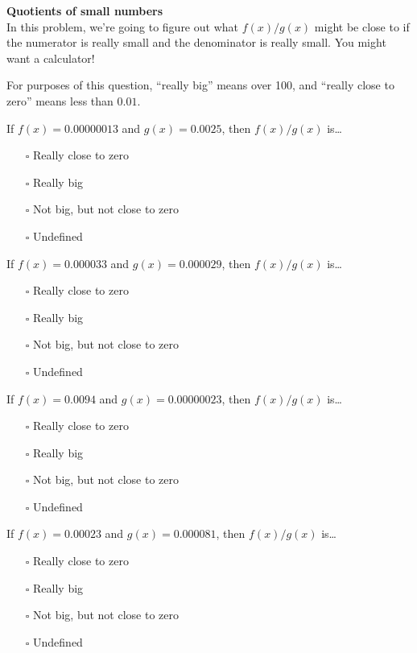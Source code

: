 \documentclass[pdftex, brazil, 12pt, twoside]{article}
\begin{document}
\begin{exercise}
  \textbf{Quotients of small numbers}\\
  In this problem, we're going to figure out what $f(x)/g(x)$ might be close to
  if the numerator is really small and the denominator is really small. You might
  want a calculator!

  For purposes of this question, ``really big'' means over 100,
  and ``really close to zero'' means less than $0.01$.

  If $f(x) = 0.00000013$ and $g(x) = 0.0025$, then $f(x)/g(x)$ is\ldots
  \begin{itemize}[noitemsep]
  \item[$\square$] Really close to zero
  \item[$\square$] Really big
  \item[$\square$] Not big, but not close to zero
  \item[$\square$] Undefined
  \end{itemize}

  If $f(x) = 0.000033$ and $g(x) = 0.000029$, then $f(x)/g(x)$ is\ldots
  \begin{itemize}[noitemsep]
  \item[$\square$] Really close to zero
  \item[$\square$] Really big
  \item[$\square$] Not big, but not close to zero
  \item[$\square$] Undefined
  \end{itemize}

  If $f(x) = 0.0094$ and $g(x) = 0.00000023$, then $f(x)/g(x)$ is\ldots
  \begin{itemize}[noitemsep]
  \item[$\square$] Really close to zero
  \item[$\square$] Really big
  \item[$\square$] Not big, but not close to zero
  \item[$\square$] Undefined
  \end{itemize}

  If $f(x) = 0.00023$ and $g(x) = 0.000081$, then $f(x)/g(x)$ is\ldots
  \begin{itemize}[noitemsep]
  \item[$\square$] Really close to zero
  \item[$\square$] Really big
  \item[$\square$] Not big, but not close to zero
  \item[$\square$] Undefined
  \end{itemize}
\end{exercise}
\end{document}
